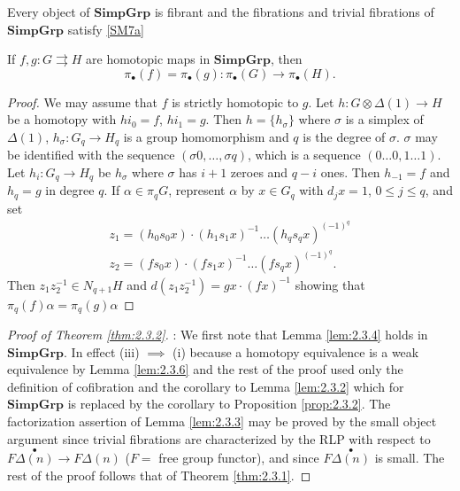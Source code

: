 \documentclass[../main]{subfiles}
\begin{document}
\begin{corollary*}
Every object of $\mathbf{SimpGrp}$ is fibrant and the fibrations and trivial fibrations of $\mathbf{SimpGrp}$ satisfy \ref{SM7a}
\end{corollary*}

\begin{lemma}\label{lem:2.3.6}
    If $f, g \colon G \rightrightarrows H$ are homotopic maps in $\mathbf{SimpGrp}$, then \[\pi_{\bullet} (f)  = \pi_{\bullet}(g) \colon \pi_{\bullet}(G) \longrightarrow \pi_{\bullet} (H).\]
\end{lemma}

\begin{proof}
We may assume that $f$ is strictly homotopic to $g$. Let $h \colon G \otimes \Delta(1) \longrightarrow H$ be a homotopy with $hi_{0} = f$, $hi_{1} = g$. Then $h = \{h_{\sigma}\}$ where $\sigma$ is a simplex of $\Delta(1)$, $h_{\sigma} \colon G_{q} \longrightarrow H_{q}$ is a group homomorphism and $q$ is the degree of $\sigma$. $\sigma$ may be identified with the sequence $(\sigma 0, \ldots, \sigma q)$, which is a sequence $(0 \ldots 0, 1 \ldots 1)$. Let $h_i \colon G_q\longrightarrow H_q$ be $h_\sigma$ where $\sigma$ has $i+1$ zeroes and $q-i$ ones. Then $h_{-1}=f$ and $h_q=g$ in degree $q$. If $\alpha\in\pi_qG$, represent $\alpha$ by $x\in G_q$ with $d_jx=1$, $0\leq j\leq q$, and set
\begin{gather*}
    z_1 = (h_0 s_0 x) \cdot (h_1 s_1 x)^{-1} \ldots (h_{q} s_{q} x)^{(-1)^{q}} \\
    z_2 = (f s_0 x) \cdot (f s_1 x)^{-1} \ldots (f s_{q} x)^{(-1)^{q}}
.\end{gather*}
Then $z_1 z_2^{-1} \in N_{q+1} H$ and $d(z_1 z_2^{-1}) = gx \cdot (fx)^{-1}$ showing that $\pi_{q}(f)\alpha = \pi_q (g) \alpha$
\end{proof}

\begin{proof}[Proof of Theorem \ref{thm:2.3.2}]: 
We first note that Lemma \ref{lem:2.3.4} holds in $\mathbf{SimpGrp}$. In effect (iii) $\implies$ (i) 
because a homotopy equivalence is a weak equivalence by Lemma \ref{lem:2.3.6} and the rest of the proof used only the definition of cofibration and the corollary to Lemma \ref{lem:2.3.2} which for $\mathbf{SimpGrp}$ is replaced by the corollary to Proposition \ref{prop:2.3.2}. The factorization assertion of Lemma \ref{lem:2.3.3} may be proved by the small object argument since trivial fibrations are characterized by the RLP with respect to $F\overset{\bullet}{\Delta(n)} \longrightarrow F \Delta(n)$ ($F=$ free group functor), and since $F\overset{\bullet}{\Delta(n)}$ is small. The rest of the proof follows that of Theorem \ref{thm:2.3.1}.
\end{proof}
\end{document}
